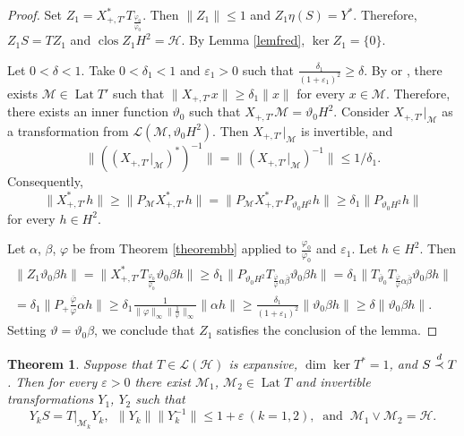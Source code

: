 \documentclass[a4paper,oneside,11pt]{amsart}
\numberwithin{equation}{section}
\theoremstyle{plain}
\newtheorem{theorem}{Theorem}[section]
\theoremstyle{definition}
\begin{document}
\begin{proof}
Set $Z_1=X_{+,T'}^*T_{\frac{\varphi_0}{\overline\varphi_0}}$. Then $\|Z_1\|\leq 1$ and $Z_1\eta(S)=Y^*$. 
Therefore, $Z_1S=TZ_1$ and $\operatorname{clos}Z_1H^2=\mathcal H$. By Lemma \ref{lemfred}, $\ker Z_1=\{0\}$.


Let $0<\delta<1$. Take  $0<\delta_1<1$ and   $\varepsilon_1>0$ such that 
$\frac{\delta_1}{(1+\varepsilon_1)^2}\geq\delta$.
By {\cite[Ch. IX.3]{nfbk}} or \cite{ker07}, there exists $\mathcal M\in\operatorname{Lat}T'$ such that 
$\|X_{+,T'}x\|\geq\delta_1\|x\|$ for every $x\in\mathcal M$. 
Therefore, there exists an inner function $\vartheta_0$ such that $X_{+,T'}{\mathcal M}=\vartheta_0 H^2$. 
Consider $X_{+,T'}|_{\mathcal M}$ as a transformation from $\mathcal L(\mathcal M,\vartheta_0 H^2)$.  
Then  $X_{+,T'}|_{\mathcal M}$ is invertible, and  
\begin{equation*} \|((X_{+,T'}|_{\mathcal M})^*)^{-1}\|=\| (X_{+,T'}|_{\mathcal M})^{-1}\|\leq 1/\delta_1.\end{equation*}
Consequently,  
\begin{equation*}
 \|X_{+,T'}^*h\|\geq \|P_{\mathcal M}X_{+,T'}^*h\|= \|P_{\mathcal M}X_{+,T'}^*P_{\vartheta_0 H^2}h\|\geq\delta_1\|P_{\vartheta_0 H^2}h\|
\end{equation*}
for every $h\in H^2$.

Let   $\alpha$, $\beta$, $\varphi$ be from Theorem \ref{theorembb} applied to 
$\frac{\varphi_0}{\overline\varphi_0}$ and $\varepsilon_1$. 
Let $h\in H^2$. Then
\begin{align*} \|Z_1\vartheta_0\beta h \|=\|X_{+,T'}^*T_{\frac{\varphi_0}{\overline\varphi_0}}\vartheta_0\beta h\|\geq
\delta_1\|P_{\vartheta_0 H^2}T_{\frac{\overline\varphi}{\varphi}\alpha\overline\beta}\vartheta_0\beta h\|=
\delta_1\|T_{\overline\vartheta_0}T_{\frac{\overline\varphi}{\varphi}\alpha\overline\beta}\vartheta_0\beta h\|\\=
\delta_1\|P_+\frac{\overline\varphi}{\varphi}\alpha h\|\geq \delta_1\frac{1}{\|\varphi\|_\infty\|\frac{1}{\varphi}\|_\infty}\|\alpha h\|\geq\frac{\delta_1}{(1+\varepsilon_1)^2}\|\vartheta_0\beta h\|\geq\delta\|\vartheta_0\beta h\|.
\end{align*}
Setting $\vartheta=\vartheta_0\beta$, we conclude that $Z_1$  satisfies the conclusion of the lemma. 
\end{proof}
 



\begin{theorem}\label{thm1} Suppose that  $T\in\mathcal L(\mathcal H)$ is expansive, $\dim\ker T^*=1$,  and 
$S\buildrel d\over\prec T$. 
 Then for every 
$\varepsilon>0$ there exist $\mathcal M_1$, $\mathcal M_2\in\operatorname{Lat}T$ 
and invertible transformations  $Y_1$, $Y_2$ such that 
\begin{equation*}Y_kS=T|_{\mathcal M_k}Y_k, \ \ \|Y_k\|\|Y_k^{-1}\|\leq 1+\varepsilon \ (k=1,2), 
\ \text{ and }  \ \mathcal M_1\vee\mathcal M_2=\mathcal H. 
\end{equation*}
\end{theorem}
\end{document}
